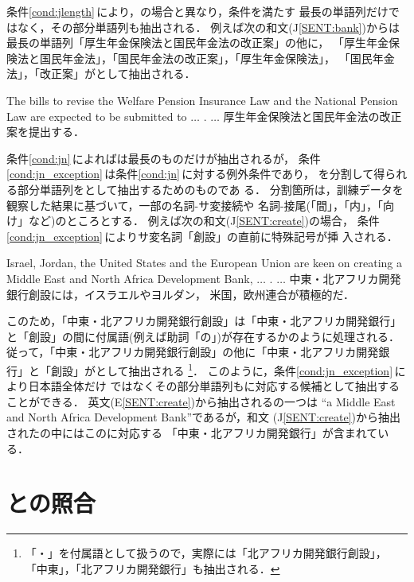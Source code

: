条件\ref{cond:jlength}\,により，{\CPNP}の場合と異なり，条件を満たす
最長の単語列だけではなく，その部分単語列も抽出される．
例えば次の和文(J\ref{SENT:bank})からは
最長の単語列「厚生年金保険法と国民年金法の改正案」の他に，
「厚生年金保険法と国民年金法」，「国民年金法の改正案」，「厚生年金保険法」，
「国民年金法」，「改正案」が{\JNP}として抽出される．
\begin{SENT2}
\sentE
The bills to revise the Welfare Pension Insurance Law and the National 
Pension Law are expected to be submitted to $\ldots$ .
\sentJ
$\ldots$ 厚生年金保険法と国民年金法の改正案を提出する．
\label{SENT:bank}
\end{SENT2}

条件\ref{cond:jn}\,によれば{\N}は最長のものだけが抽出されるが，
条件\ref{cond:jn_exception}\,は条件\ref{cond:jn}\,に対する例外条件であり，
{\N}を分割して得られる部分単語列を{\JNP}として抽出するためのものであ
る．
分割箇所は，訓練データを観察した結果に基づいて，一部の名詞-サ変接続や
名詞-接尾(「間」，「内」，「向け」など)のところとする．
例えば次の和文(J\ref{SENT:create})の場合，
条件\ref{cond:jn_exception}\,によりサ変名詞「創設」の直前に特殊記号が挿
入される．
\begin{SENT2}
\sentE
Israel, Jordan, the United States and the European Union are keen on 
creating a Middle East and North Africa Development Bank, $\ldots$ .
\sentJ
$\ldots$ 中東・北アフリカ開発銀行創設には，イスラエルやヨルダン，
米国，欧州連合が積極的だ．
\label{SENT:create}
\end{SENT2}
このため，「中東・北アフリカ開発銀行創設」は「中東・北アフリカ開発銀行」
と「創設」の間に付属語(例えば助詞「の」)が存在するかのように処理される．
従って，「中東・北アフリカ開発銀行創設」の他に「中東・北アフリカ開発銀
行」と「創設」が{\JNP}として抽出される
\footnote{「・」を付属語として扱うので，実際には「北アフリカ開発銀行創設」，
「中東」，「北アフリカ開発銀行」も抽出される．}．
このように，条件\ref{cond:jn_exception}\,により日本語{\N}全体だけ
ではなくその部分単語列も{\CPNP}に対応する候補として抽出することができる．
英文(E\ref{SENT:create})から抽出される{\CPNP}の一つは
``a Middle East and North Africa Development Bank''であるが，和文
(J\ref{SENT:create})から抽出された{\JNP}の中にはこの{\CPNP}に対応する
「中東・北アフリカ開発銀行」が含まれている． 


\section{{\MTNP}と{\JNP}の照合}
\label{sec:alignment:align}

